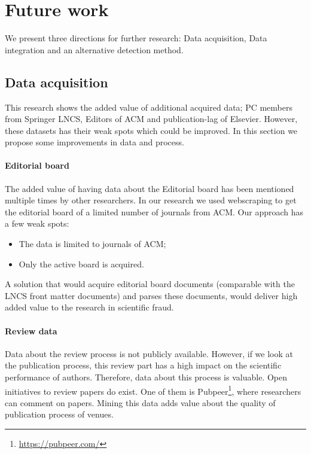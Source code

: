 \documentclass{ou-report}
\begin{document}
\section{Future work}
We present three directions for further research: Data acquisition, Data 
integration and an alternative detection method.

\subsection{Data acquisition}
This research shows the added value of additional acquired data; PC members from 
Springer LNCS, Editors of ACM and publication-lag of Elsevier. However, these 
datasets has their weak spots which could be improved. 
In this section we propose some improvements in data and process.

\paragraph{Editorial board}
The added value of having data about the Editorial board has been mentioned 
multiple times by other researchers. In our research we used webscraping to get
the editorial board of a limited number of journals from ACM. Our approach has a 
few weak spots:
\begin{itemize}
    \item The data is limited to journals of ACM;
    \item Only the active board is acquired.
\end{itemize}
A solution that would acquire editorial board documents (comparable with the 
LNCS front matter documents) and parses these documents, would deliver high 
added value to the research in scientific fraud.

\paragraph{Review data}
Data about the review process is not publicly available. However, if we look at
the publication process, this review part has a high impact on the scientific 
performance of authors. Therefore, data about this process is valuable.
Open initiatives to review papers do exist. One of them is
Pubpeer\footnote{\url{https://pubpeer.com/}}, 
where researchers can comment on papers.
Mining this data adds value about the quality of publication process of 
venues.
\end{document}
